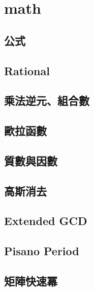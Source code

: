 \section{math}
    \subsection{公式}
        
    \subsection{Rational}
        
    \subsection{乘法逆元、組合數}
        
    \subsection{歐拉函數}
    \subsection{質數與因數}
        
    \subsection{高斯消去}
        
    \subsection{Extended GCD}
    \subsection{Pisano Period}
        
    \subsection{矩陣快速冪}
         

